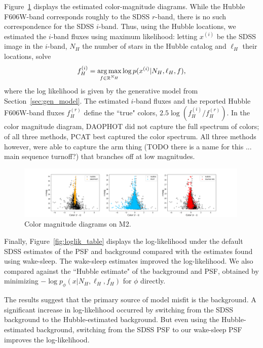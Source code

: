 Figure~\ref{fig:cmd_m2} displays the estimated color-magnitude diagrams. While the Hubble F606W-band corresponds roughly to the SDSS $r$-band, there is no such correspondence for the SDSS $i$-band. Thus, using the Hubble locations, we estimated the $i$-band fluxes using maximum likelihood: letting $x^{(i)}$ be the SDSS image in the $i$-band, $N_H$ the number of stars in the Hubble catalog and $\ell_H$ their locations, solve
\begin{align}
   f^{(i)}_H = \operatorname*{arg\,max}_{f\in\mathbb{R}^{N_H}} \log p(x^{(i)} | N_H, \ell_H, f)
   \label{eq:optim_iband_flux},
\end{align}
where the log likelihood is given by the generative model from Section~\ref{sec:gen_model}.
The estimated $i$-band fluxes and the reported Hubble F606W-band fluxes $f_H^{(r)}$ define the ``true" colors, $2.5\log(f_H^{(i)}/f_H^{(r)})$. 
In the color magnitude diagram, DAOPHOT did not capture the full spectrum of colors; of all three methods, PCAT best captured the color spectrum. All three methods however, were able to capture the arm thing (TODO there is a name for this ... main sequence turnoff?) that branches off at low magnitudes. 

\begin{figure}[ht]
    \centering
    \includegraphics[width=0.99\textwidth]{figures/cmd.png}
    \caption{Color magnitude diagrams on M2. }
    \label{fig:cmd_m2}
\end{figure}


Finally, Figure~\ref{fig:loglik_table} displays the log-likelihood under the default SDSS estimates of the PSF and background compared with the estimates found using wake-sleep. 
The wake-sleep estimates improved the log-likelihood.
We also compared against the ``Hubble estimate" of the background and PSF, obtained by minimizing $- \log p_\phi(x | N_{H}, \ell_{H}, f_{H})$ for $\phi$ directly. 

The results suggest that the primary source of model misfit is the background. A significant increase in log-likelihood occurred by switching from the SDSS background to the Hubble-estimated background. 
But even using the Hubble-estimated background, switching from the SDSS PSF to our wake-sleep PSF improves the log-likelihood. 

